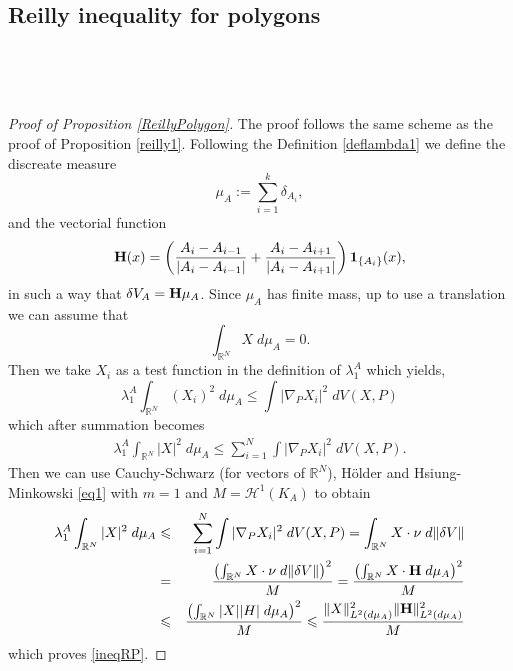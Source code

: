 \documentclass[12pt,english]{smfart} %
\newtheorem{proposition}[theorem]{Proposition}
\theoremstyle{remark}
\newcommand{\R}{\mathbb{R}}
\begin{document}
\subsection{Reilly inequality for polygons}


\

\

\begin{proof}[Proof of Proposition \ref{ReillyPolygon}] The proof follows the same scheme as the proof of Proposition \ref{reilly1}. Following the Definition \ref{deflambda1} we define the discreate measure 
 $$\mu_A:=\sum_{i=1}^k\delta_{A_i},$$
 and the vectorial function $${\bf H}(x)= \left(\frac{A_{i}-A_{i-1}}{|A_i-A_{i-1}|}+ \frac{A_{i}-A_{i+1}}{|A_i-A_{i+1}|}\right) {\bf 1}_{\{A_i\}}(x),$$
 in such a way that $\delta V_A= {\bf H}\mu_A$.
Since  $\mu_A$ has finite mass,    up to use a translation we can assume that
$$ \int_{\mathbb{R}^N}X \; d \mu_A=0.$$
 Then we take $X_i$ as a test function in the definition of $\lambda_1^A$ which yields,
 $$\lambda_1^A \int_{\mathbb{R}^N} (X_i)^2 \;d  \mu_A\leqslant \int |\nabla_P X_i|^2 \; dV(X,P)$$ 
 which after summation becomes
 \begin{eqnarray}
 \lambda_1^A \int_{\mathbb{R}^N} |X|^2  \;d \mu_A\leqslant \sum_{i=1}^{N}\int  |\nabla_P X_i|^2 \; dV(X,P). \label{ineq1}
 \end{eqnarray}
 Then we can use Cauchy-Schwarz (for vectors of $\mathbb{R}^N$), H\"older and  Hsiung-Minkowski \eqref{eq1} with $m=1$ and $M=\mathcal{H}^1(K_A)$ to obtain
\begin{eqnarray}
 \lambda_1^A \int_{\mathbb{R}^N} |X|^2  \;d  \mu_A &\leqslant& \sum_{i=1}^{N}\int |\nabla_P X_i|^2 \; dV(X,P)=  \int_{\mathbb{R}^N} X \cdot \nu \;d\|\delta V\|  \notag \\
 &=& \frac{\left( \int_{\mathbb{R}^N} X \cdot \nu \;d\|\delta V\|  \right)^2}{M} = \frac{\left(\int_{\mathbb{R}^N} X \cdot {\bf H}\;d \mu_A\right)^2}{M}  \label{eigen} \\
 &\leqslant &  \frac{ \left( \int_{\mathbb{R}^N} |X | |H | \;d \mu_A \right)^2}{M} \leqslant   \frac{\|X\|_{L^2(d\mu_A)}^2 \|{\bf H}\|_{L^2(d\mu_A)}^2 }{M} \notag
 \end{eqnarray}
 which proves \eqref{ineqRP}.
  \end{proof}
  
\end{document}
